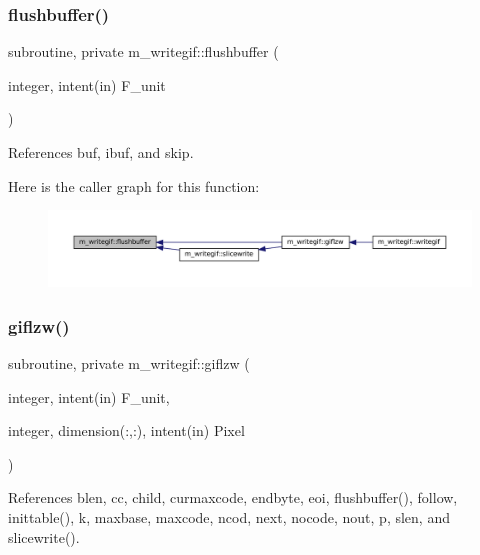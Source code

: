 \subsubsection{\texorpdfstring{flushbuffer()}{flushbuffer()}}
{\footnotesize\ttfamily subroutine, private m\+\_\+writegif\+::flushbuffer (\begin{DoxyParamCaption}\item[{integer, intent(in)}]{F\+\_\+unit }\end{DoxyParamCaption})\hspace{0.3cm}{\ttfamily [private]}}



References buf, ibuf, and skip.

Here is the caller graph for this function\+:
\nopagebreak
\begin{figure}[H]
\begin{center}
\leavevmode
\includegraphics[width=350pt]{namespacem__writegif_a48c5ca5487be9dbe565c0d4f8aa02d0d_icgraph}
\end{center}
\end{figure}
\mbox{\label{namespacem__writegif_a13c09be69495f4ba21ecb7c134216a17}} 
\subsubsection{\texorpdfstring{giflzw()}{giflzw()}}
{\footnotesize\ttfamily subroutine, private m\+\_\+writegif\+::giflzw (\begin{DoxyParamCaption}\item[{integer, intent(in)}]{F\+\_\+unit,  }\item[{integer, dimension(\+:,\+:), intent(in)}]{Pixel }\end{DoxyParamCaption})\hspace{0.3cm}{\ttfamily [private]}}



References blen, cc, child, curmaxcode, endbyte, eoi, flushbuffer(), follow, inittable(), k, maxbase, maxcode, ncod, next, nocode, nout, p, slen, and slicewrite().

